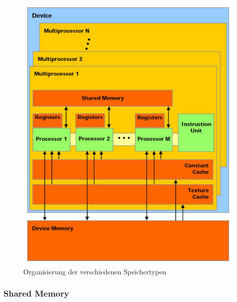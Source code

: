 \begin{figure}
	\centering
	\includegraphics[scale=0.4]{images/cuda_mem.png}
	\caption{Organisierung der verschiedenen Speichertypen}
	\label{img:cuda_mem}
\end{figure}

\subsubsection{Shared Memory}

